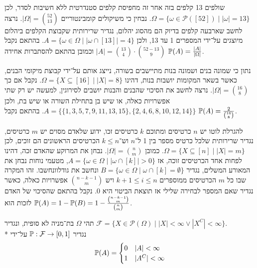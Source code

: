 \Subquestion{}
שולפים 13 קלפים בזה אחר זה מחפיסת קלפים סטנדרטית ללא חשיבות לסדר, לכן $\Omega = \{ \omega \in \mathcal{P}([52]) \mid |\omega| = 13 \}$.
נבחין כי משיקולים קומבינטוריים $|\Omega| = \binom{52}{13}$.
נרצה לחשב שארבעה קלפים בדיוק הם מהסוג יהלום, נגדיר שרירותית שקבוצת הקלפים ביהלום מיוצגים על־ידי המספרים 1 עד 13, ולכן $A = \{ \omega \in \Omega \mid |\omega \cap [13]| = 4 \}$.
בהתאם נקבל $|A| = \binom{13}{4} \cdot \binom{52 - 13}{9}$ וכמובן בהתאם להסתברות אחידה $\mathbb{P}(A) = \frac{|A|}{|\Omega|}$.

\Subquestion{}
נתון כי שמונה בנים ושמונה בנות מתיישבים בשורה, נייצג אותם על־ידי קבוצת מיקומי הבנים, כאשר בשאר המקומות יושבות בנות, דהינו $\Omega = \{ X \subseteq [16] \mid |X| = 8 \}$.
נקבל אם כך $|\Omega| = \binom{16}{8}$.
נרצה לחשב את הסיכוי שהבנים והבנות יושבים לסירוגין, למעשה יש רק שתי אפשרויות כאלה, או שיש בן בתחילת השורה או שיש בת, ולכן $A = \{ \{1, 3, 5, 7, 9, 11, 13, 15\}, \{2, 4, 6, 8, 10, 12, 14\}\}$.
בהתאם נקבל $\mathbb{P}(A) = \frac{2}{\binom{16}{8}}$.

\Subquestion{}
להגרלת לוטו יש $n$ כרטיסים ומתוכם $k$ כרטיסים זכו, ידוע שלאדם מסוים יש $m$ כרטיסים, נגדיר שרירותית שלכל כרטיס מספר בין 1 ל־$n$ וש־$k \le n$ הכרטיסים הראשונים הם זוכים, לכן $\Omega = \{ X \subseteq [n] \mid |X| = m \}$.
כמובן $|\Omega| = \binom{n}{m}$.
נבחן את המרוקע שהאדם זכה, דהינו לפחות אחד הכרטיסים זוכה, אז $A = \{ \omega \in \Omega \mid |\omega \cap [k]| > 0 \}$, מטעמי נוחות נבחן את המאורע המשלים,
נגדיר $B = \{ \omega \in \Omega \mid \omega \cap [k] = \emptyset \}$ ונחשב את גודלוונחשבו.
זהו המקרה שבו כל $m$ הכרטיסים ממוספרים $k + 1 \le i \le n$ ויש $\binom{n - k - 1}{m}$ אפשרויות כאלה, כאשר נגדיר שאם המספר לבחירה שלילי אז תוצאת הביטוי היא 0.
נקבל בהתאם שהסיכוי של האדם לזכות הוא $\mathbb{P}(A) = 1 - \mathbb{P}(B) = 1 - \frac{\binom{n - k - 1}{m}}{\binom{n}{m}}$.

\Question{}
תהי $\Omega$ בת־מניה לא סופית, ונגדיר $\mathcal{F} = \{ X \in \mathcal{P}(\Omega) \mid |X| < \infty \lor |X^C| < \infty \}$. \\*
נגדיר $\mathbb{P} : \mathcal{F} \to [0, 1]$ על־ידי
\[
	\mathbb{P}(A) = \begin{cases}
		0 & |A| < \infty \\
		1 & |A^C| < \infty
	\end{cases}
\]

